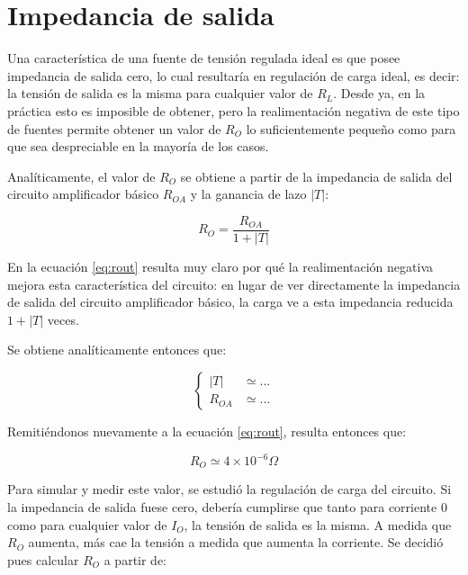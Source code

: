 \documentclass[e2_tp1_main.tex]{subfiles}
\begin{document}
\section{Impedancia de salida}

Una caracter\'istica de una fuente de tensi\'on regulada ideal es que posee impedancia de salida cero, lo cual resultar\'ia en regulaci\'on de carga ideal, es decir: la tensi\'on de salida es la misma para cualquier valor de $R_L$. Desde ya, en la pr\'actica esto es imposible de obtener, pero la realimentaci\'on negativa de este tipo de fuentes permite obtener un valor de $R_O$ lo suficientemente peque\~no como para que sea despreciable en la mayor\'ia de los casos. 

Anal\'iticamente, el valor de $R_O$ se obtiene a partir de la impedancia de salida del circuito amplificador b\'asico $R_{OA}$ y la ganancia de lazo $|T|$:

\begin{equation}
	R_O = \frac{R_{OA}}{1+|T|}
	\label{eq:rout}
\end{equation}

En la ecuaci\'on \ref{eq:rout} resulta muy claro por qu\'e la realimentaci\'on negativa mejora esta caracter\'istica del circuito: en lugar de ver directamente la impedancia de salida del circuito amplificador b\'asico, la carga ve a esta impedancia reducida $1+|T|$ veces.


Se obtiene anal\'iticamente entonces que:

\begin{equation}
	\left\{
	\begin{aligned}
	|T| &\simeq ... \\
	R_{OA} &\simeq ...
	\end{aligned}
	\right.
\end{equation}


Remiti\'endonos nuevamente a la ecuaci\'on \ref{eq:rout}, resulta entonces que:

\begin{equation}
	R_O \simeq 4\times 10^{-6}\Omega
\end{equation}

Para simular y medir este valor, se estudi\'o la regulaci\'on de carga del circuito. Si la impedancia de salida fuese cero, deber\'ia cumplirse que tanto para corriente 0 como para cualquier valor de $I_O$, la tensi\'on de salida es la misma. A medida que $R_O$ aumenta, m\'as cae la tensi\'on a medida que aumenta la corriente. Se decidi\'o pues calcular $R_O$ a partir de:
\end{document}
